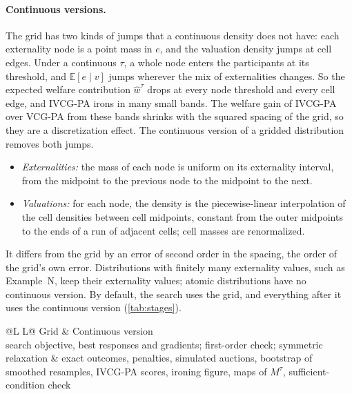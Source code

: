 \documentclass[11pt]{article}
\newcommand{\code}[1]{\texttt{#1}}
\begin{document}
\paragraph{Continuous versions.} The grid has two kinds of jumps that a continuous density does not have: each externality node is a point mass in $e$, and the valuation density jumps at cell edges. Under a continuous $\tau$, a whole node enters the participants at its threshold, and $\mathbb{E}[e\mid v]$ jumps wherever the mix of externalities changes. So the expected welfare contribution $\hat w^\tau$ drops at every node threshold and every cell edge, and IVCG-PA irons in many small bands. The welfare gain of IVCG-PA over VCG-PA from these bands shrinks with the squared spacing of the grid, so they are a discretization effect. The continuous version of a gridded distribution removes both jumps.
\begin{itemize}
    \item \emph{Externalities:} the mass of each node is uniform on its externality interval, from the midpoint to the previous node to the midpoint to the next.
    \item \emph{Valuations:} for each node, the density is the piecewise-linear interpolation of the cell densities between cell midpoints, constant from the outer midpoints to the ends of a run of adjacent cells; cell masses are renormalized.
\end{itemize}
It differs from the grid by an error of second order in the spacing, the order of the grid's own error. Distributions with finitely many externality values, such as Example~N, keep their externality values; atomic distributions have no continuous version. By default, the search uses the grid, and everything after it uses the continuous version (\cref{tab:stages}).

\begin{table}[ht]
\centering\small
\begin{tabularx}{\linewidth}{@{}L L@{}}
\toprule
Grid & Continuous version \\
\midrule
search objective, best responses and gradients; first-order check; symmetric relaxation & exact outcomes, penalties, simulated auctions, bootstrap of smoothed resamples, IVCG-PA scores, ironing figure, maps of $M^\tau$, sufficient-condition check \\
\bottomrule
\end{tabularx}
\caption{Distribution used at each stage (default; option \code{continuous = false} uses the grid throughout).}
\label{tab:stages}
\end{table}
\end{document}
